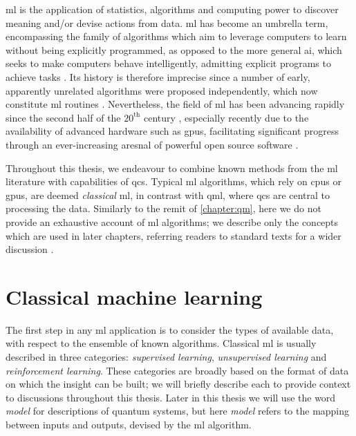\glsresetall
\Gls{ml} is the application of statistics, algorithms and computing power to discover meaning and/or devise actions from data.
\gls{ml} has become an umbrella term, encompassing the family of algorithms
    which aim to leverage computers to learn without being explicitly programmed,
    as opposed to the more general \gls{ai}, which seeks to make computers behave intelligently,
    admitting explicit programs to achieve tasks \cite{MLvAI}.
Its history is therefore imprecise since a number of early, apparently unrelated algorithms were proposed independently, 
    which now constitute \gls{ml} routines \cite{mcculloch1943logical, turing2009computing}. 
Nevertheless, the field of \gls{ml} has been advancing rapidly since the second half of the $20^{\textrm{th}}$ century \cite{russell2002artificial}, 
    especially recently due to the availability of advanced hardware such as \glspl{gpu}, 
    facilitating significant progress through an ever-increasing aresnal of powerful open source software \cite{pedregosa2011scikit, abadi2016tensorflow, paszke2019pytorch}. 
\par 

Throughout this thesis, we endeavour to combine known methods from the \gls{ml} literature with capabilities of \glspl{qc}\footnotemark. 
Typical \gls{ml} algorithms, which rely on \glspl{cpu} or \glspl{gpu}, are deemed \emph{classical} \acrlong{ml},
    in contrast with \gls{qml}, where \glspl{qc} are central to processing the data.
Similarly to the remit of \cref{chapter:qm}, here we do not provide an exhaustive account of \gls{ml} algorithms;
    we describe only the concepts which are used in later chapters, 
    referring readers to standard texts for a wider discussion \cite{russell2002artificial, hastie2009elements}.



\section{Classical machine learning}\label{sec:classical_ml}

The first step in any \gls{ml} application is to consider the types of available data,
    with respect to the ensemble of known algorithms. 
Classical \gls{ml} is usually described in three categories:
    \emph{supervised learning}, \emph{unsupervised learning} and \emph{reinforcement learning}.  
These categories are broadly based on the format of data on which the insight can be built;
    we will briefly describe each to provide context to discussions throughout this thesis. 
Later in this thesis we will use the word \emph{model} for descriptions of quantum systems, 
    but here \emph{model} refers to the mapping between inputs and outputs, devised by the \gls{ml} algorithm.
\par 

